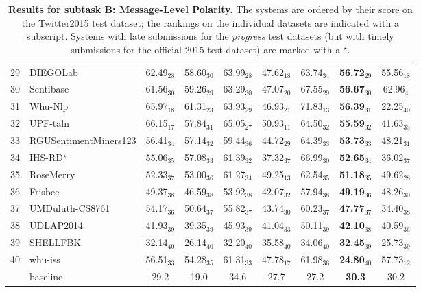 \documentclass[11pt]{article}
\begin{document}
\begin{table}[t!]
\begin{small}
\begin{tabular}{c|l|cc|ccc|cc}
	29 & DIEGOLab & 62.49$_{28}$ & 58.60$_{30}$ & 63.99$_{28}$ & 47.62$_{18}$ & 63.74$_{34}$ & \bf 56.72$_{29}$ & 55.56$_{18}$\\
	30 & Sentibase & 61.56$_{30}$ & 59.26$_{29}$ & 63.29$_{30}$ & 47.07$_{20}$ & 67.55$_{29}$ & \bf 56.67$_{30}$ & 62.96$_{4}$\\
	31 & Whu-Nlp & 65.97$_{18}$ & 61.31$_{23}$ & 63.93$_{29}$ & 46.93$_{21}$ & 71.83$_{13}$ & \bf 56.39$_{31}$ & 22.25$_{40}$\\
	32 & UPF-taln & 66.15$_{17}$ & 57.84$_{31}$ & 65.05$_{27}$ & 50.93$_{11}$ & 64.50$_{32}$ & \bf 55.59$_{32}$ & 41.63$_{35}$\\
	33 & RGUSentimentMiners123 & 56.41$_{34}$ & 57.14$_{32}$ & 59.44$_{36}$ & 44.72$_{29}$ & 64.39$_{33}$ & \bf 53.73$_{33}$ & 48.21$_{31}$\\
	34 & IHS-RD$^\star$ & 55.06$_{35}$ & 57.08$_{33}$ & 61.39$_{32}$ & 37.32$_{37}$ & 66.99$_{30}$ & \bf 52.65$_{34}$ & 36.02$_{37}$\\
	35 & RoseMerry & 52.33$_{37}$ & 53.00$_{36}$ & 61.27$_{34}$ & 49.25$_{13}$ & 62.54$_{35}$ & \bf 51.18$_{35}$ & 49.62$_{28}$\\
	36 & Frisbee & 49.37$_{38}$ & 46.59$_{38}$ & 53.92$_{38}$ & 42.07$_{32}$ & 57.94$_{38}$ & \bf 49.19$_{36}$ & 48.26$_{30}$\\
	37 & UMDuluth-CS8761 & 54.17$_{36}$ & 50.64$_{37}$ & 55.82$_{37}$ & 43.74$_{30}$ & 60.23$_{37}$ & \bf 47.77$_{37}$ & 34.40$_{38}$\\
	38 & UDLAP2014 & 41.93$_{39}$ & 39.35$_{39}$ & 45.93$_{39}$ & 41.04$_{33}$ & 50.11$_{39}$ & \bf 42.10$_{38}$ & 40.59$_{36}$\\
	39 & SHELLFBK & 32.14$_{40}$ & 26.14$_{40}$ & 32.20$_{40}$ & 35.58$_{40}$ & 34.06$_{40}$ & \bf 32.45$_{39}$ & 25.73$_{39}$\\
	40 & whu-iss & 56.51$_{33}$ & 54.28$_{35}$ & 61.31$_{33}$ & 47.78$_{17}$ & 61.98$_{36}$ & \bf 24.80$_{40}$ & 57.73$_{12}$\\
	\hline
	   & baseline & 29.2 & 19.0 & 34.6 & 27.7 & 27.2 & \bf 30.3 & 30.2 \\
	\hline
    \end{tabular}
    \end{small}
    \caption{\label{tab:res-subtaskB} \textbf{Results for subtask B: Message-Level Polarity.}
             The systems are ordered by their score on the Twitter2015 test dataset;
             the rankings on the individual datasets are indicated with a subscript.
             Systems with late submissions for the \emph{progress} test datasets
             (but with timely submissions for the official 2015 test dataset) are marked with a $^\star$.}
  \end{table}
\end{document}
